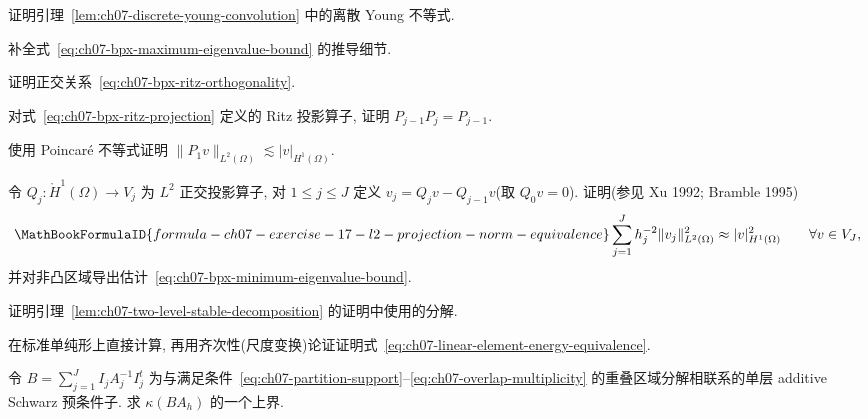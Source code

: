 \begin{MBExercise}
\label{exr:ch07-12}
证明引理~\ref{lem:ch07-discrete-young-convolution} 中的离散 Young 不等式.
\end{MBExercise}

\begin{MBExercise}
\label{exr:ch07-13}
补全式~\eqref{eq:ch07-bpx-maximum-eigenvalue-bound} 的推导细节.
\end{MBExercise}

\begin{MBExercise}
\label{exr:ch07-14}
证明正交关系~\eqref{eq:ch07-bpx-ritz-orthogonality}.
\end{MBExercise}

\begin{MBExercise}
\label{exr:ch07-15}
对式~\eqref{eq:ch07-bpx-ritz-projection} 定义的 Ritz 投影算子, 证明 $P_{j-1}P_j=P_{j-1}$.
\end{MBExercise}

\begin{MBExercise}
\label{exr:ch07-16}
使用 Poincaré 不等式证明 $\|P_1v\|_{L^2(\Omega)}\lesssim|v|_{H^1(\Omega)}$.
\end{MBExercise}

\begin{MBExercise}
\label{exr:ch07-17}
令 $Q_j:\mathring H^1(\Omega)\longrightarrow V_j$ 为 $L^2$ 正交投影算子, 对 $1\leq j\leq J$ 定义 $v_j=Q_jv-Q_{j-1}v$(取 $Q_0v=0$). 证明(参见 Xu 1992; Bramble 1995)
\[
\MathBookFormulaID{formula-ch07-exercise-17-l2-projection-norm-equivalence}
\sum_{j=1}^{J}h_j^{-2}\|v_j\|_{L^2(\Omega)}^2
\approx|v|_{H^1(\Omega)}^2
\qquad\forall v\in V_J,
\]
并对非凸区域导出估计~\eqref{eq:ch07-bpx-minimum-eigenvalue-bound}.
\end{MBExercise}

\begin{MBExercise}
\label{exr:ch07-18}
证明引理~\ref{lem:ch07-two-level-stable-decomposition} 的证明中使用的分解.
\end{MBExercise}

\begin{MBExercise}
\label{exr:ch07-19}
在标准单纯形上直接计算, 再用齐次性(尺度变换)论证证明式~\eqref{eq:ch07-linear-element-energy-equivalence}.
\end{MBExercise}

\begin{MBExercise}
\label{exr:ch07-20}
令 $B=\sum_{j=1}^{J}I_jA_j^{-1}I_j^t$ 为与满足条件~\eqref{eq:ch07-partition-support}--\eqref{eq:ch07-overlap-multiplicity} 的重叠区域分解相联系的单层 additive Schwarz 预条件子. 求 $\kappa(BA_h)$ 的一个上界.
\end{MBExercise}

